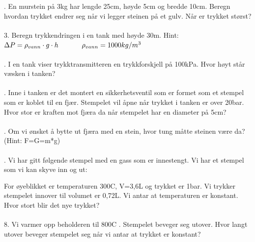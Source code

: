 \documentclass[12pt,a4paper]{article}
\begin{document}
. En murstein på 3kg har lengde 25cm, høyde 5cm og bredde 10cm.  Beregn hvordan trykket endrer seg  når vi legger steinen på et gulv.   Når er trykket størst?\\\\
3. Beregn trykkendringen i en tank med høyde 30m. Hint: $\Delta P=\rho_{vann} \cdot g\cdot h\hspace{1.20cm} \rho_{vann}=1000kg/m^3$\\\\

. I en tank viser trykktransmitteren en trykkforskjell på 100kPa.  Hvor høyt står væsken i tanken?\\\\

. Inne i tanken er det montert en sikkerhetsventil som er formet som et stempel som er koblet til en fjær.  Stempelet vil åpne når trykket i  tanken er over 20bar.   Hvor stor er kraften mot fjæra da når stempelet har en diameter på 5cm?\\\\
.	Om vi ønsket å bytte ut fjæra med en stein, hvor tung måtte steinen være da? (Hint: F=G=m*g)\\\\

.	Vi har gitt følgende stempel med en gass som er innestengt.  Vi har et stempel som vi kan skyve inn og ut:\vspace{0.5cm}\\
\begin{center}
\end{center}\vspace{1cm}
For øyeblikket er temperaturen 300C, V=3,6L og trykket er 1bar.  Vi trykker stempelet innover til volumet er 0,72L.   Vi antar at temperaturen er konstant.  Hvor stort blir det nye trykket?
\\\\8.	Vi varmer opp beholderen til 800C .  Stempelet beveger seg utover.  Hvor langt utover beveger stempelet seg når vi antar at trykket er konstant?\\
\end{document}

